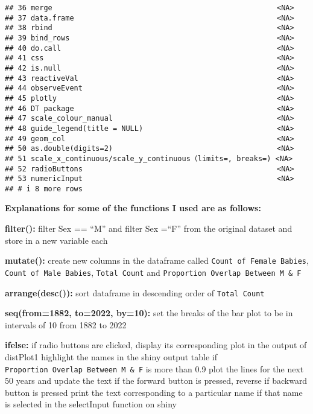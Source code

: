 \documentclass[
]{article}
\begin{document}
\begin{verbatim}
## 36 merge                                                    <NA> 
## 37 data.frame                                               <NA> 
## 38 rbind                                                    <NA> 
## 39 bind_rows                                                <NA> 
## 40 do.call                                                  <NA> 
## 41 css                                                      <NA> 
## 42 is.null                                                  <NA> 
## 43 reactiveVal                                              <NA> 
## 44 observeEvent                                             <NA> 
## 45 plotly                                                   <NA> 
## 46 DT package                                               <NA> 
## 47 scale_colour_manual                                      <NA> 
## 48 guide_legend(title = NULL)                               <NA> 
## 49 geom_col                                                 <NA> 
## 50 as.double(digits=2)                                      <NA> 
## 51 scale_x_continuous/scale_y_continuous（limits=, breaks=) <NA> 
## 52 radioButtons                                             <NA> 
## 53 numericInput                                             <NA> 
## # i 8 more rows
\end{verbatim}

\textbf{Explanations for some of the functions I used are as follows:}

\textbf{filter():} filter Sex == ``M'' and filter Sex =``F'' from the
original dataset and store in a new variable each

\textbf{mutate():} create new columns in the dataframe called
\texttt{Count\ of\ Female\ Babies}, \texttt{Count\ of\ Male\ Babies},
\texttt{Total\ Count} and
\texttt{Proportion\ Overlap\ Between\ M\ \&\ F}

\textbf{arrange(desc()):} sort dataframe in descending order of
\texttt{Total\ Count}

\textbf{seq(from=1882, to=2022, by=10):} set the breaks of the bar plot
to be in intervals of 10 from 1882 to 2022

\textbf{ifelse:} if radio buttons are clicked, display its corresponding
plot in the output of distPlot1 highlight the names in the shiny output
table if \texttt{Proportion\ Overlap\ Between\ M\ \&\ F} is more than
0.9 plot the lines for the next 50 years and update the text if the
forward button is pressed, reverse if backward button is pressed print
the text corresponding to a particular name if that name is selected in
the selectInput function on shiny
\end{document}
